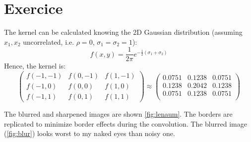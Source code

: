 \documentclass[12pt,english]{article}
\renewcommand{\thesection}{Exercice~\arabic{section}}
\begin{document}
\section[]{\thesection}
The kernel can be calculated knowing the 2D Gaussian distribution (assuming $x_1, x_2$ uncorrelated, i.e. $\rho=0$, $\sigma_1=\sigma_2 = 1$):
\begin{equation}
f(x,y) = \frac{1}{2\pi}e^{-\frac{1}{2}(\sigma_1+\sigma_2)}
\end{equation}
Hence, the kernel is:
\begin{equation}
\begin{pmatrix}
f(-1,-1) & f(0,-1) & f(1,-1)\\
f(-1,0) & f(0,0) & f(1,0)\\
f(-1,1) & f(0, 1) & f(1,1)	
\end{pmatrix} \approx \begin{pmatrix}
0.0751 & 0.1238 & 0.0751\\
0.1238 & 0.2042 & 0.1238\\
0.0751 & 0.1238 & 0.0751\\
\end{pmatrix}
\end{equation}

The blurred and sharpened images are shown \autoref{fig:lenaum}. The borders are replicated to minimize border effects during the convolution. The blurred image (\autoref{fig:blur}) looks worst to my naked eyes than noisy one.
\end{document}
